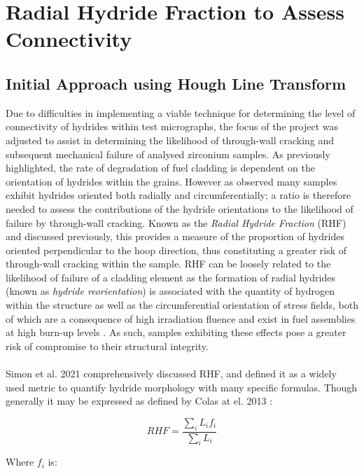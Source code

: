 \documentclass{article}
\begin{document}
\section{Radial Hydride Fraction to Assess Connectivity}
\subsection{Initial Approach using Hough Line Transform}

    Due to difficulties in implementing a viable technique for determining the level of connectivity of hydrides within test micrographs, the focus of the project was adjusted to assist in determining the likelihood of through-wall cracking and subsequent mechanical failure of analysed zirconium samples. As previously highlighted, the rate of degradation of fuel cladding is dependent on the orientation of hydrides within the grains. However as observed many samples exhibit hydrides oriented both radially and circumferentially; a ratio is therefore needed to assess the contributions of the hydride orientations to the likelihood of failure by through-wall cracking. Known as the \textit{Radial Hydride Fraction} (RHF) and discussed previously, this provides a measure of the proportion of hydrides oriented perpendicular to the hoop direction, thus constituting a greater risk of through-wall cracking within the sample. RHF can be loosely related to the likelihood of failure of a cladding element as the formation of radial hydrides (known as \textit{hydride reorientation}) is associated with the quantity of hydrogen within the structure as well as the circumferential orientation of stress fields, both of which are a consequence of high irradiation fluence and exist in fuel assemblies at high burn-up levels \cite{Plyasov2020}. As such, samples exhibiting these effects pose a greater risk of compromise to their structural integrity.
    \\
    \\
    Simon et al. 2021 \cite{Simon2021} comprehensively discussed RHF, and defined it as a widely used metric to quantify hydride morphology with many specific formulas. Though generally it may be expressed as defined by Colas at el. 2013 \cite{Colas2013}:
    
    \begin{equation}
        RHF = \frac{ \sum_i{L_i f_i} }{ \sum_i{L_i} }
    \end{equation}
    \label{equ:RHF}
    
    \noindent Where $f_i$ is:
    
\end{document}
